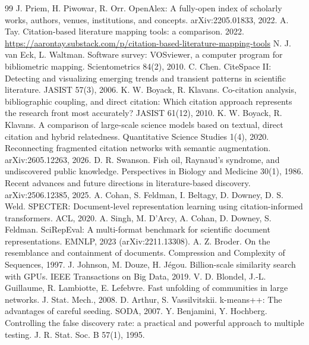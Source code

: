 \documentclass[11pt,a4paper]{article}
\begin{document}
\begin{thebibliography}{99}
 J. Priem, H. Piwowar, R. Orr. OpenAlex: A fully-open index of scholarly works, authors, venues, institutions, and concepts. arXiv:2205.01833, 2022.
 A. Tay. Citation-based literature mapping tools: a comparison. 2022. \url{https://aarontay.substack.com/p/citation-based-literature-mapping-tools}
 N. J. van Eck, L. Waltman. Software survey: VOSviewer, a computer program for bibliometric mapping. Scientometrics 84(2), 2010.
 C. Chen. CiteSpace II: Detecting and visualizing emerging trends and transient patterns in scientific literature. JASIST 57(3), 2006.
 K. W. Boyack, R. Klavans. Co-citation analysis, bibliographic coupling, and direct citation: Which citation approach represents the research front most accurately? JASIST 61(12), 2010.
 K. W. Boyack, R. Klavans. A comparison of large-scale science models based on textual, direct citation and hybrid relatedness. Quantitative Science Studies 1(4), 2020.
 Reconnecting fragmented citation networks with semantic augmentation. arXiv:2605.12263, 2026.
 D. R. Swanson. Fish oil, Raynaud's syndrome, and undiscovered public knowledge. Perspectives in Biology and Medicine 30(1), 1986.
 Recent advances and future directions in literature-based discovery. arXiv:2506.12385, 2025.
 A. Cohan, S. Feldman, I. Beltagy, D. Downey, D. S. Weld. SPECTER: Document-level representation learning using citation-informed transformers. ACL, 2020.
 A. Singh, M. D'Arcy, A. Cohan, D. Downey, S. Feldman. SciRepEval: A multi-format benchmark for scientific document representations. EMNLP, 2023 (arXiv:2211.13308).
 A. Z. Broder. On the resemblance and containment of documents. Compression and Complexity of Sequences, 1997.
 J. Johnson, M. Douze, H. J\'egou. Billion-scale similarity search with GPUs. IEEE Transactions on Big Data, 2019.
 V. D. Blondel, J.-L. Guillaume, R. Lambiotte, E. Lefebvre. Fast unfolding of communities in large networks. J. Stat. Mech., 2008.
 D. Arthur, S. Vassilvitskii. k-means++: The advantages of careful seeding. SODA, 2007.
 Y. Benjamini, Y. Hochberg. Controlling the false discovery rate: a practical and powerful approach to multiple testing. J. R. Stat. Soc. B 57(1), 1995.
\end{thebibliography}
\end{document}
